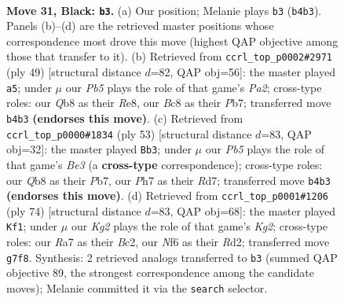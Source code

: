 \documentclass[11pt]{article}
\begin{document}
\clearpage

\begin{figure}[p]\centering
\begin{subfigure}{0.46\textwidth}\centering
\resizebox{\linewidth}{!}{%
\newchessgame
\chessboard[
  setfen={1qb5/r4pkp/5np1/6N1/Pp6/6P1/3NRPBP/R5K1 b - - 0 31},
  showmover=false,
  pgfstyle=straightmove, color=movearrow, markmove={b4-b3}
]}
\caption{}
\end{subfigure}\hfill
\begin{subfigure}{0.46\textwidth}\centering
\resizebox{\linewidth}{!}{%
\newchessgame
\chessboard[
  setfen={4r3/ppp2rkp/2np2p1/3N4/2P2P2/6P1/PP1R2KP/5R2 b - - 0 25},
  showmover=false,
  pgfstyle=straightmove, color=movearrow, markmove={a7-a5}
]}
\caption{}
\end{subfigure}
\\[4pt]
\begin{subfigure}{0.46\textwidth}\centering
\resizebox{\linewidth}{!}{%
\newchessgame
\chessboard[
  setfen={r5k1/1p1r1pp1/4b2p/1N5n/4P3/P4P2/2R3PP/B4RK1 b - - 4 27},
  showmover=false,
  pgfstyle=straightmove, color=movearrow, markmove={e6-b3}
]}
\caption{}
\end{subfigure}\hfill
\begin{subfigure}{0.46\textwidth}\centering
\resizebox{\linewidth}{!}{%
\newchessgame
\chessboard[
  setfen={8/1p4k1/p1p2r2/P3r1n1/1Q2p1b1/2P5/1PBR1PK1/8 w - - 6 38},
  showmover=false,
  pgfstyle=straightmove, color=movearrow, markmove={g2-f1}
]}
\caption{}
\end{subfigure}
\caption{\textbf{Move 31, Black: \texttt{b3}.} (a) Our position; Melanie plays \texttt{b3} (\texttt{b4b3}). Panels (b)--(d) are the retrieved master positions whose correspondence most drove this move (highest QAP objective among those that transfer to it). (b) Retrieved from \texttt{ccrl\_top\_p0002\#2971} (ply 49) [structural distance $d$=82, QAP obj=56]: the master played \texttt{a5}; under $\mu$ our \emph{Pb5} plays the role of that game's \emph{Pa2}; cross-type roles: our \emph{Q}b8 as their \emph{R}e8, our \emph{B}c8 as their \emph{P}b7; transferred move \texttt{b4b3} \textbf{(endorses this move)}. (c) Retrieved from \texttt{ccrl\_top\_p0000\#1834} (ply 53) [structural distance $d$=83, QAP obj=32]: the master played \texttt{Bb3}; under $\mu$ our \emph{Pb5} plays the role of that game's \emph{Be3} (a \textbf{cross-type} correspondence); cross-type roles: our \emph{Q}b8 as their \emph{P}b7, our \emph{P}h7 as their \emph{R}d7; transferred move \texttt{b4b3} \textbf{(endorses this move)}. (d) Retrieved from \texttt{ccrl\_top\_p0001\#1206} (ply 74) [structural distance $d$=83, QAP obj=68]: the master played \texttt{Kf1}; under $\mu$ our \emph{Kg2} plays the role of that game's \emph{Kg2}; cross-type roles: our \emph{R}a7 as their \emph{B}c2, our \emph{N}f6 as their \emph{R}d2; transferred move \texttt{g7f8}. Synthesis: 2 retrieved analogs transferred to \texttt{b3} (summed QAP objective 89, the strongest correspondence among the candidate moves); Melanie committed it via the \texttt{search} selector.}
\label{fig:thought-m61}
\end{figure}
\end{document}
